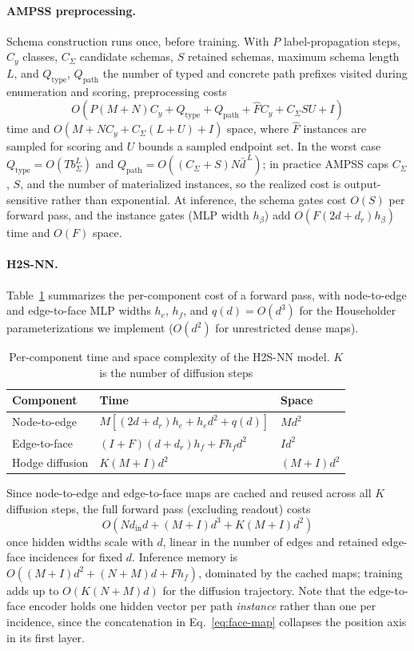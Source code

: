 \documentclass[sigconf,anonymous,review]{acmart}
\newcommand{\method}{\textsc{H2S-NN}}
\newcommand{\ampss}{\textsc{AMPSS}}
\begin{document}
\paragraph{\ampss{} preprocessing.} Schema construction runs once, before training. With $P$
label-propagation steps, $C_y$ classes, $C_\Sigma$ candidate schemas, $S$ retained schemas,
maximum schema length $L$, and $Q_{\mathrm{type}}$, $Q_{\mathrm{path}}$ the number of typed
and concrete path prefixes visited during enumeration and scoring, preprocessing costs
\[
O\!\left(P(M+N)C_y + Q_{\mathrm{type}} + Q_{\mathrm{path}} + \widehat{F}C_y + C_\Sigma S U + I\right)
\]
time and $O\!\left(M+NC_y+C_\Sigma(L+U)+I\right)$ space, where $\widehat{F}$ instances are
sampled for scoring and $U$ bounds a sampled endpoint set. In the worst case
$Q_{\mathrm{type}}=O(Tb_\Sigma^{L})$ and $Q_{\mathrm{path}}=O((C_\Sigma+S)N\bar{d}^{\,L})$;
in practice \ampss{} caps $C_\Sigma$, $S$, and the number of materialized instances, so the
realized cost is output-sensitive rather than exponential. At inference, the schema gates
cost $O(S)$ per forward pass, and the instance gates (MLP width $h_\beta$) add
$O\!\left(F(2d+d_r)h_\beta\right)$ time and $O(F)$ space.

\paragraph{\method{}.} Table~\ref{tab:complexity} summarizes the per-component
cost of a forward pass, with node-to-edge and edge-to-face MLP widths $h_e$, $h_f$, and
$q(d)=O(d^3)$ for the Householder parameterizations we implement ($O(d^2)$ for
unrestricted dense maps).

\begin{table}[h]
\centering
\scriptsize
\caption{Per-component time and space complexity of the \method{} model. $K$ is the number of diffusion steps}
\label{tab:complexity}
\begin{tabular}{lll}
\toprule
Component & Time & Space \\
\midrule
Node-to-edge & $M\left[(2d+d_r)h_e+h_ed^2+q(d)\right]$ & $Md^2$ \\
Edge-to-face & $(I+F)(d+d_r)h_f+Fh_fd^2$ & $Id^2$ \\
Hodge diffusion & $K(M+I)d^2$ & $(M+I)d^2$ \\
\bottomrule
\end{tabular}
\end{table}

Since node-to-edge and edge-to-face maps are cached and reused across all $K$ diffusion
steps, the full forward pass (excluding readout) costs
\[
O\!\left(Nd_{\mathrm{in}}d + (M+I)d^3 + K(M+I)d^2\right)
\]
once hidden widths scale with $d$, linear in the number of edges and retained edge-face
incidences for fixed $d$. Inference memory is $O\!\left((M+I)d^2+(N+M)d+Fh_f\right)$,
dominated by the cached maps; training adds up to $O(K(N+M)d)$ for the diffusion trajectory.
Note that the edge-to-face encoder holds one hidden vector per path \emph{instance} rather than
one per incidence, since the concatenation in Eq.~\eqref{eq:face-map} collapses the position axis
in its first layer.
\end{document}
